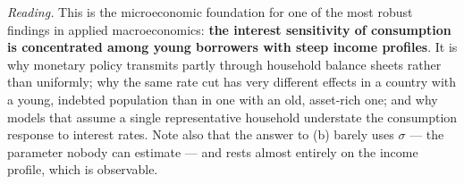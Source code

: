 \documentclass[12pt, letterpaper]{article}
\begin{document}
\begin{tcolorbox}[evenbox,title={Problem 6.2 \quad Savings Rates for Different People}]
\smallskip
\emph{Reading.} This is the microeconomic foundation for one of the most robust findings in
applied macroeconomics: \textbf{the interest sensitivity of consumption is concentrated among
young borrowers with steep income profiles}. It is why monetary policy transmits partly
through household balance sheets rather than uniformly; why the same rate cut has very
different effects in a country with a young, indebted population than in one with an old,
asset-rich one; and why models that assume a single representative household understate the
consumption response to interest rates. Note also that the answer to (b) barely uses
$\sigma$ --- the parameter nobody can estimate --- and rests almost entirely on the income
profile, which is observable.
\end{tcolorbox}

\end{document}
